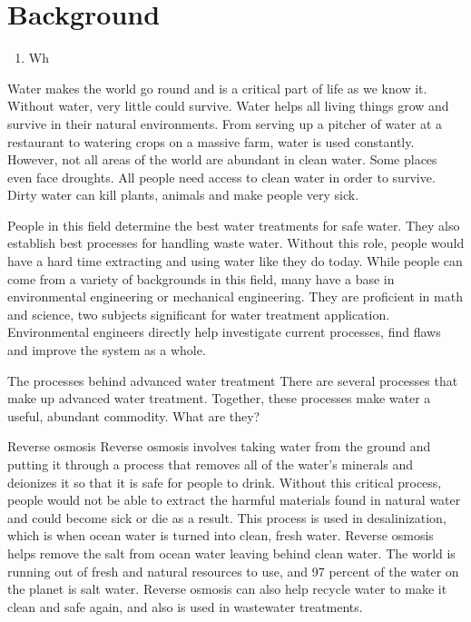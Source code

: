 
\chapter{Background}


\begin{enumerate}
\item Wh
\end{enumerate}
Water makes the world go round and is a critical part of life as we know it. Without water, very little could survive. Water helps all living things grow and survive in their natural environments. From serving up a pitcher of water at a restaurant to watering crops on a massive farm, water is used constantly. However, not all areas of the world are abundant in clean water. Some places even face droughts. All people need access to clean water in order to survive. Dirty water can kill plants, animals and make people very sick.

People in this field determine the best water treatments for safe water. They also establish best processes for handling waste water. Without this role, people would have a hard time extracting and using water like they do today. While people can come from a variety of backgrounds in this field, many have a base in environmental engineering or mechanical engineering. They are proficient in math and science, two subjects significant for water treatment application. Environmental engineers directly help investigate current processes, find flaws and improve the system as a whole.

The processes behind advanced water treatment
There are several processes that make up advanced water treatment. Together, these processes make water a useful, abundant commodity. What are they?

Reverse osmosis
Reverse osmosis involves taking water from the ground and putting it through a process that removes all of the water’s minerals and deionizes it so that it is safe for people to drink. Without this critical process, people would not be able to extract the harmful materials found in natural water and could become sick or die as a result. This process is used in desalinization, which is when ocean water is turned into clean, fresh water. Reverse osmosis helps remove the salt from ocean water leaving behind clean water. The world is running out of fresh and natural resources to use, and 97 percent of the water on the planet is salt water. Reverse osmosis can also help recycle water to make it clean and safe again, and also is used in wastewater treatments.

